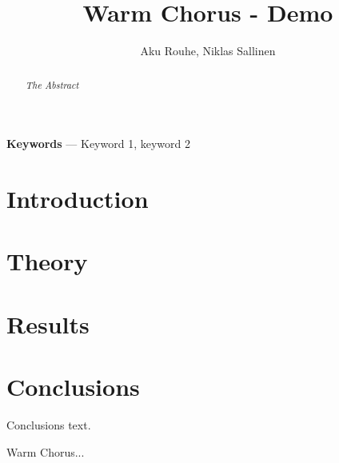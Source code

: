 \documentclass[11pt,a4paper,twoside]{article}
\title{Warm Chorus -  Demo}
\author{Aku Rouhe, Niklas Sallinen}
\begin{document}
\maketitle

\begin{abstract}
\noindent\it The Abstract
\end{abstract}

\noindent\textbf{Keywords} --- Keyword 1, keyword 2

\section{Introduction}

\section{Theory}






\section{Results}

\clearpage
\section{Conclusions}

Conclusions text.




%
%

\clearpage
\begin{thebibliography}{99}
 Warm Chorus...
\end{thebibliography}
\end{document}
